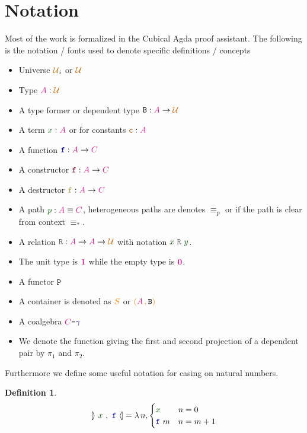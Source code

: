 \documentclass[twoside,11pt,openright]{report}
\theoremstyle{plain} %
\theoremstyle{definition}
\newtheorem{defn}[thm]{Definition}%
\theoremstyle{remark}
\newcommand*{\term}[1]{\textcolor{green!30!black}{#1}} %
\newcommand*{\pathterm}[1]{\textcolor{green!40!black}{#1}}
\newcommand*{\type}[1]{\textcolor{magenta!90!black}{#1}}
\newcommand*{\container}[1]{\textcolor{orange}{#1}}
\newcommand*{\containerpair}[2]{\ensuremath{\colorlet{savedleftcolor}{.}\color{orange}\left(\color{savedleftcolor}#1\,\textcolor{orange}{\mathbf{,}}\,#2\color{orange}\right)\color{savedleftcolor}}}
\newcommand*{\universe}[1]{\textcolor{orange!80!black}{#1}}
\newcommand*{\unit}{\type{\textbf{1}}}
\newcommand*{\empt}{\type{\textbf{0}}}
\newcommand*{\coalg}[2]{#1\texttt{-}#2}
\newcommand*{\relation}[1]{\textcolor{gray!75!black}{\ensuremath{\mathtt{#1}}}}
\newcommand*{\constant}[1]{\textcolor{orange!60!black}{\ensuremath{\mathtt{#1}}}}
\newcommand*{\function}[1]{\textcolor{blue!60!black}{\ensuremath{\mathtt{#1}}}}
\newcommand*{\constructor}[1]{\textcolor{purple!60!black}{\ensuremath{\mathtt{#1}}}}
\newcommand*{\destructor}[1]{\textcolor{yellow!60!black}{\ensuremath{\mathtt{#1}}}}
\newcommand*{\typeformer}[1]{\ensuremath{\mathtt{#1}}}
\newcommand*{\functor}[1]{\ensuremath{\mathbf{\mathtt{#1}}}}
\newcommand*{\natcases}[2]{\ensuremath{\mathbb{[\hspace{-.5mm}\rangle}~\ensuremath{#1}~,~\ensuremath{#2}~\mathbb{\langle\hspace{-.5mm}]}}}
\begin{document}
\section{Notation}
Most of the work is formalized in the Cubical Agda proof assistant. The following is the notation / fonts used to denote specific definitions / concepts
\begin{itemize}
\item Universe \(\universe{\mathcal{U}}_i\) or \(\universe{\mathcal{U}}\)
\item Type \(\type{A} : \universe{\mathcal{U}}\)
\item A type former or dependent type \(\typeformer{B} : \type{A} \rightarrow \universe{\mathcal{U}}\)
\item A term \(\term{x} : \type{A}\) or for constants \(\constant{c} : \type{A}\)
\item A function \(\function{f} : \type{A} \rightarrow \type{C}\)
\item A constructor \(\constructor{f} : \type{A} \rightarrow \type{C}\) 
\item A destructor \(\destructor{f} : \type{A} \rightarrow \type{C}\) 
\item A path \(\pathterm{p} : \type{A} \equiv \type{C}\), heterogeneous paths are denotes \(\equiv_p\) or if the path is clear from context \(\equiv_*\).
\item A relation \(\relation{R} : \type{A} \rightarrow \type{A} \rightarrow \universe{\mathcal{U}}\) with notation \(\term{x}~\relation{R}~\term{y}\).
\item The unit type is \(\unit\) while the empty type is \(\empt\).
\item A functor \(\functor{P}\)
\item A container is denoted as \(\container{S}\) or \(\containerpair{\type{A}}{\typeformer{B}}\)
\item A coalgebra \(\coalg{\type{C}}{\function{\gamma}}\)
\item We denote the function giving the first and second projection of a dependent pair by \(\pi_1\) and \(\pi_2\).
\end{itemize}
Furthermore we define some useful notation for casing on natural numbers.
\begin{defn}
  \begin{equation}
    \natcases{\term{x}}{\function{f}} = \lambda\,n, \begin{cases} \term{x} & n = 0 \\ \function{f}~m & n = m + 1 \end{cases}
  \end{equation}
\end{defn}
\end{document}
